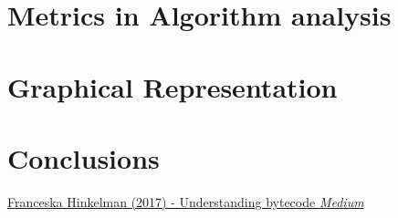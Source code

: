 \documentclass[12pt]{article}
\begin{document}
\clearpage
\section*{Metrics in Algorithm analysis}
\hspace{0.8cm}

\clearpage
\section*{Graphical Representation}
\hspace{0.8cm}

\clearpage
\section*{Conclusions}
\hspace{0.6cm} 

\begin{thebibliography}{9}

    \href{https://medium.com/dailyjs/understanding-v8s-bytecode-317d46c94775}{Franceska
      Hinkelman (2017) - Understanding bytecode \emph{Medium}}
\end{thebibliography}
\end{document}
